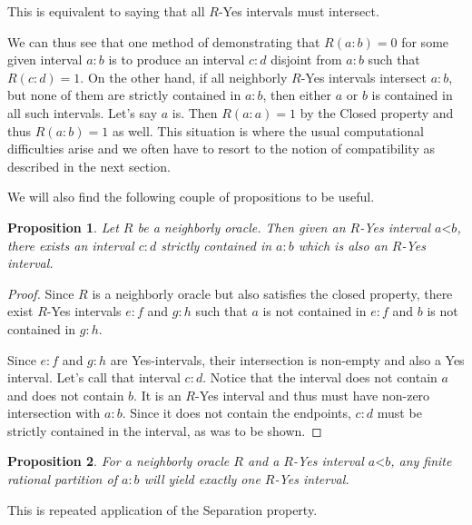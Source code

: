 \documentclass[12pt]{article}
\newtheorem{proposition}{Proposition}
\theoremstyle{remark}
\newcommand{\lt}{\mathord{<}}
\begin{document}
This is equivalent to saying that all $R$-Yes intervals must intersect. 

We can thus see that one method of demonstrating that $R(a:b)=0$ for some given interval $a:b$ is to produce an interval $c:d$ disjoint from $a:b$ such that $R(c:d)=1$. On the other hand, if all neighborly $R$-Yes intervals intersect $a:b$, but none of them are strictly contained in $a:b$, then either $a$ or $b$ is contained in all such intervals. Let's say $a$ is. Then $R(a:a)=1$ by the Closed property and thus $R(a:b)=1$ as well. This situation is where the usual computational difficulties arise and we often have to resort to the notion of compatibility as described in the next section. 

We will also find the following couple of propositions to be useful. 

\begin{proposition}\label{pr:subinter}
Let $R$ be a neighborly oracle. Then given an $R$-Yes interval $a\lt b$, there exists an interval $c:d$ strictly contained in $a:b$ which is also an $R$-Yes interval. 
\end{proposition}

\begin{proof}
Since $R$ is a neighborly oracle but also satisfies the closed property, there exist $R$-Yes intervals $e:f$ and $g:h$ such that $a$ is not contained in $e:f$ and $b$ is not contained in $g:h$. 

Since $e:f$ and $g:h$ are Yes-intervals, their intersection is non-empty and also a Yes interval. Let's call that interval $c:d$.  Notice that the interval does not contain $a$ and does not contain $b$. It is an $R$-Yes interval and thus must have non-zero intersection with $a:b$. Since it does not contain the endpoints, $c:d$ must be strictly contained in the interval, as was to be shown. 
\end{proof}

\begin{proposition}\label{pr:multi}
For a neighborly oracle $R$ and a $R$-Yes interval $a\lt b$, any finite rational partition of $a:b$ will yield exactly one $R$-Yes interval. 
\end{proposition}

This is repeated application of the Separation property. 
\end{document}
